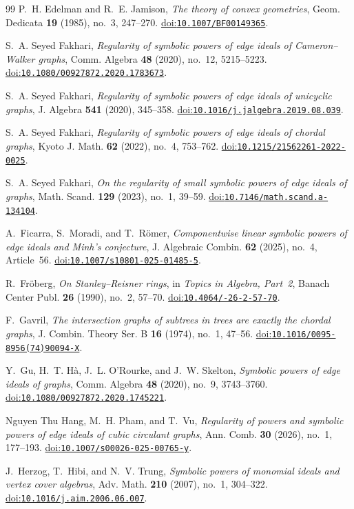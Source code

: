 \documentclass[11pt]{amsart}
\theoremstyle{definition}
\newcommand{\doi}[1]{\href{https://doi.org/#1}{doi:\nolinkurl{#1}}}
\begin{document}
\begin{thebibliography}{99}
P.~H. Edelman and R.~E. Jamison,
\emph{The theory of convex geometries},
Geom. Dedicata \textbf{19} (1985), no.~3, 247--270.
\doi{10.1007/BF00149365}.

S.~A. Seyed Fakhari,
\emph{Regularity of symbolic powers of edge ideals of Cameron--Walker graphs},
Comm. Algebra \textbf{48} (2020), no.~12, 5215--5223.
\doi{10.1080/00927872.2020.1783673}.

S.~A. Seyed Fakhari,
\emph{Regularity of symbolic powers of edge ideals of unicyclic graphs},
J. Algebra \textbf{541} (2020), 345--358.
\doi{10.1016/j.jalgebra.2019.08.039}.

S.~A. Seyed Fakhari,
\emph{Regularity of symbolic powers of edge ideals of chordal graphs},
Kyoto J. Math. \textbf{62} (2022), no.~4, 753--762.
\doi{10.1215/21562261-2022-0025}.

S.~A. Seyed Fakhari,
\emph{On the regularity of small symbolic powers of edge ideals of graphs},
Math. Scand. \textbf{129} (2023), no.~1, 39--59.
\doi{10.7146/math.scand.a-134104}.

A.~Ficarra, S.~Moradi, and T.~R\"omer,
\emph{Componentwise linear symbolic powers of edge ideals and Minh's conjecture},
J. Algebraic Combin. \textbf{62} (2025), no.~4, Article~56.
\doi{10.1007/s10801-025-01485-5}.

R.~Fr\"oberg,
\emph{On Stanley--Reisner rings},
in \emph{Topics in Algebra, Part~2},
Banach Center Publ. \textbf{26} (1990), no.~2, 57--70.
\doi{10.4064/-26-2-57-70}.

F.~Gavril,
\emph{The intersection graphs of subtrees in trees are exactly the chordal graphs},
J. Combin. Theory Ser. B \textbf{16} (1974), no.~1, 47--56.
\doi{10.1016/0095-8956(74)90094-X}.

Y.~Gu, H.~T. H\`a, J.~L. O'Rourke, and J.~W. Skelton,
\emph{Symbolic powers of edge ideals of graphs},
Comm. Algebra \textbf{48} (2020), no.~9, 3743--3760.
\doi{10.1080/00927872.2020.1745221}.

Nguyen Thu Hang, M.~H. Pham, and T.~Vu,
\emph{Regularity of powers and symbolic powers of edge ideals of cubic circulant graphs},
Ann. Comb. \textbf{30} (2026), no.~1, 177--193.
\doi{10.1007/s00026-025-00765-y}.

J.~Herzog, T.~Hibi, and N.~V. Trung,
\emph{Symbolic powers of monomial ideals and vertex cover algebras},
Adv. Math. \textbf{210} (2007), no.~1, 304--322.
\doi{10.1016/j.aim.2006.06.007}.


\end{thebibliography}
\end{document}
